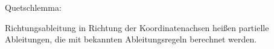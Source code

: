 \documentclass{../tudscript}
\begin{document}

Quetschlemma:
    

Richtungsableitung in Richtung der Koordinatenachsen heißen partielle Ableitungen,
die mit bekannten Ableitungsregeln berechnet werden.

\end{document}
